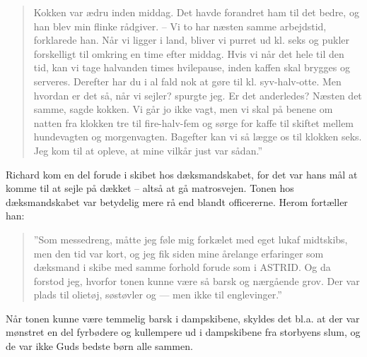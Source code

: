 \begin{quote}
    Kokken var ædru inden middag. Det havde forandret ham til det bedre,
    og han blev min flinke rådgiver. -- Vi to har næsten samme
    arbejdstid, forklarede han. Når vi ligger i land, bliver vi purret ud
    kl. seks og pukler forskelligt til omkring en time efter middag. Hvis
    vi når det hele til den tid, kan vi tage halvanden times hvilepause,
    inden kaffen skal brygges og serveres. Derefter har du i al fald nok
    at gøre til kl.  syv-halv-otte. Men hvordan er det så, når vi sejler?
    spurgte jeg. Er det anderledes? Næsten det samme, sagde kokken. Vi
    går jo ikke vagt, men vi skal på benene om natten fra klokken tre til
    fire-halv-fem og sørge for kaffe til skiftet mellem hundevagten og
    morgenvagten. Bagefter kan vi så lægge os til klokken seks. Jeg kom
    til at opleve, at mine vilkår just var sådan.''

\end{quote}

Richard kom en del forude i skibet hos dæksmandskabet, for det var hans
mål at komme til at sejle på dækket -- altså at gå matrosvejen. Tonen
hos dæksmandskabet var betydelig mere rå end blandt officererne. Herom
fortæller han: 

\begin{quote}

    ''Som messedreng, måtte jeg føle mig forkælet med eget
    lukaf midtskibs, men den tid var kort, og jeg fik siden mine årelange
    erfaringer som dæksmand i skibe med samme forhold forude som i ASTRID.
    Og da forstod jeg, hvorfor tonen  kunne være
    så barsk og nærgående grov. Der var plads til olietøj, søstøvler og
     --- men ikke
    til englevinger.'' 

\end{quote}

Når tonen kunne være temmelig barsk i dampskibene, skyldes det bl.a. at
der var mønstret en del fyrbødere og kullempere ud i dampskibene fra
storbyens slum, og de var ikke Guds bedste børn alle sammen.
